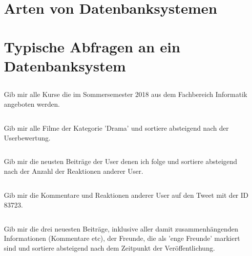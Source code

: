 \subsection{}

\section{Arten von Datenbanksystemen}


\section{Typische Abfragen an ein Datenbanksystem}
\subsection{}
Gib mir alle Kurse die im Sommersemester 2018 aus dem Fachbereich Informatik angeboten werden.

\subsection{}
Gib mir alle Filme der Kategorie 'Drama' und sortiere absteigend nach der Userbewertung.

\subsection{}
Gib mir die neusten Beiträge der User denen ich folge und sortiere absteigend nach der Anzahl der Reaktionen anderer User.

\subsection{}
Gib mir die Kommentare und Reaktionen anderer User auf den Tweet mit der ID 83723.

\subsection{}
Gib mir die drei neuesten Beiträge, inklusive aller damit zusammenhängenden Informationen (Kommentare etc), der Freunde, die als 'enge Freunde' markiert sind und sortiere absteigend nach dem Zeitpunkt der Veröffentlichung.

\printbibliography %


